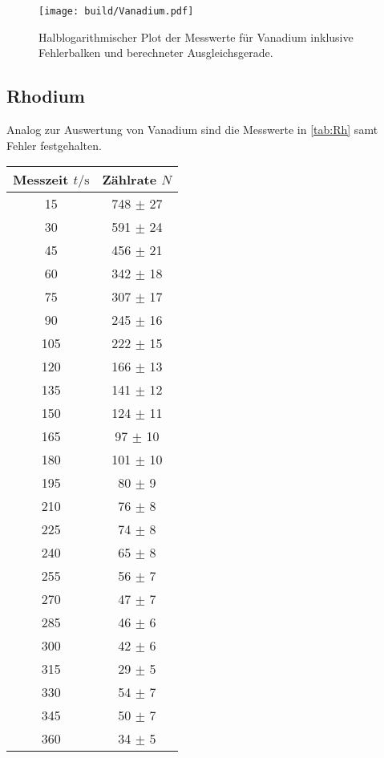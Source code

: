 \begin{figure}[H]
    \centering
    \texttt{[image: build/Vanadium.pdf]}
    \caption{Halblogarithmischer Plot der Messwerte für Vanadium inklusive Fehlerbalken und berechneter Ausgleichsgerade.}
    \label{fig:Vn}
\end{figure}

\subsection{Rhodium}

Analog zur Auswertung von Vanadium sind die Messwerte in \autoref{tab:Rh} samt Fehler festgehalten.

\begin{table} [H]
    \centering
    \begin{tabular}{c c}
      \toprule
      Messzeit $t/\unit{\second}$ & Zählrate $N$\\
      \midrule
      15  & 748 $\pm$ 27 \\
      30  & 591 $\pm$ 24 \\
      45  & 456 $\pm$ 21 \\
      60  & 342 $\pm$ 18 \\
      75  & 307 $\pm$ 17 \\
      90  & 245 $\pm$ 16 \\
      105 & 222 $\pm$ 15 \\
      120 & 166 $\pm$ 13 \\
      135 & 141 $\pm$ 12 \\
      150 & 124 $\pm$ 11 \\
      165 &  97 $\pm$ 10 \\
      180 & 101 $\pm$ 10 \\
      195 &  80 $\pm$ 9 \\
      210 &  76 $\pm$ 8 \\
      225 &  74 $\pm$ 8 \\
      240 &  65 $\pm$ 8 \\
      255 &  56 $\pm$ 7 \\
      270 &  47 $\pm$ 7 \\
      285 &  46 $\pm$ 6 \\
      300 &  42 $\pm$ 6 \\
      315 &  29 $\pm$ 5 \\
      330 &  54 $\pm$ 7 \\
      345 &  50 $\pm$ 7 \\
      360 &  34 $\pm$ 5 \\

\end{tabular}
\end{table}

